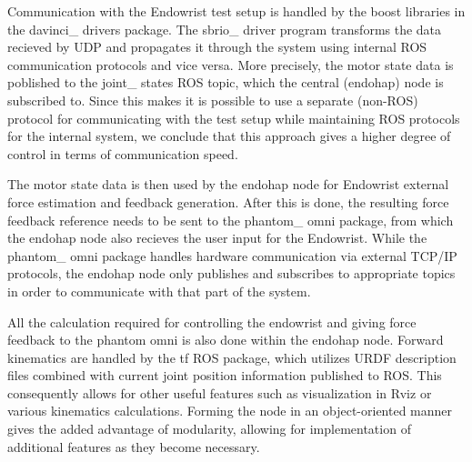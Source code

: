 Communication with the Endowrist test setup is handled by the boost libraries in the davinci\_ drivers package. 
The sbrio\_ driver program transforms the data recieved by UDP and propagates it through the system using internal ROS communication protocols and vice versa. 
More precisely, the motor state data is poblished to the joint\_ states ROS topic, which the central (endohap) node is subscribed to.
Since this makes it is possible to use a separate (non-ROS) protocol for communicating with the test setup while maintaining ROS protocols for the internal system, we conclude that this approach gives a higher degree of control in terms of communication speed.

The motor state data is then used by the endohap node for Endowrist external force estimation and feedback generation.
After this is done, the resulting force feedback reference needs to be sent to the phantom\_ omni package, from which the endohap node also recieves the user input for the Endowrist. While the phantom\_ omni package handles hardware communication via external TCP/IP protocols, the endohap node only publishes and subscribes to appropriate topics in order to communicate with that part of the system.

All the calculation required for controlling the endowrist and giving force feedback to the phantom omni is also done within the endohap node. Forward kinematics are handled by the tf ROS package, which utilizes URDF description files combined with current joint position information published to ROS.
This consequently allows for other useful features such as visualization in Rviz or various kinematics calculations.
Forming the node in an object-oriented manner gives the added advantage of modularity, allowing for implementation of additional features as they become necessary. 

